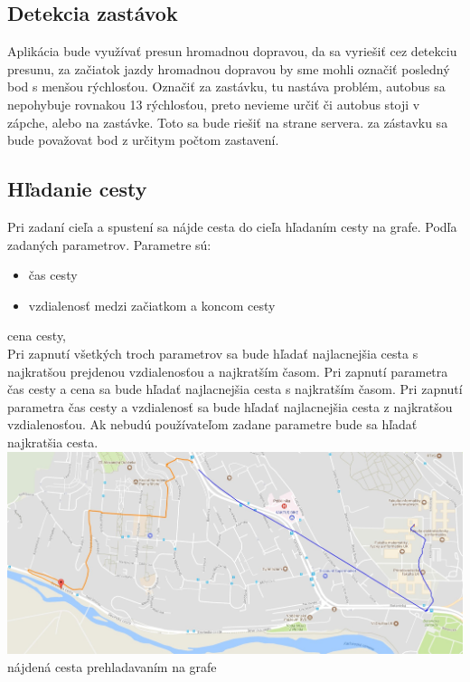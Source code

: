 \subsection{Detekcia zastávok}

Aplikácia bude využívať presun hromadnou dopravou, da sa vyriešiť cez detekciu presunu,
za začiatok jazdy hromadnou dopravou by sme mohli označiť posledný bod s menšou
rýchlosťou. Označiť za zastávku, tu nastáva problém, autobus sa nepohybuje rovnakou 
13
rýchlosťou, preto nevieme určiť či autobus stoji v zápche, alebo na zastávke. Toto sa bude
riešiť na strane servera. 
za zástavku sa bude považovat bod z určitym počtom zastavení.


\subsection{Hľadanie cesty}

Pri zadaní cieľa a spustení sa nájde cesta do cieľa hľadaním cesty na grafe. Podľa zadaných
parametrov.
Parametre sú:
\begin{itemize}
	\item čas cesty
	\item vzdialenosť medzi začiatkom a koncom cesty
\end{itemize} cena cesty,\\


Pri zapnutí všetkých troch parametrov sa bude hľadať najlacnejšia cesta s najkratšou
prejdenou vzdialenosťou a najkratším časom.
Pri zapnutí parametra čas cesty a cena sa bude hľadať najlacnejšia cesta s najkratším časom.
Pri zapnutí parametra čas cesty a vzdialenosť sa bude hľadať najlacnejšia cesta z najkratšou
vzdialenosťou.
Ak nebudú používateľom zadane parametre bude sa hľadať najkratšia cesta.\\
\includegraphics[width=\textwidth]{images/najdeniecesty}
nájdená cesta prehladavaním na grafe